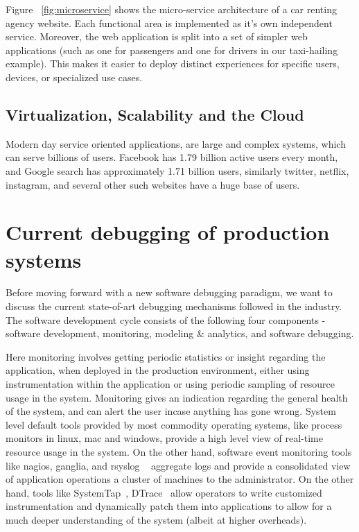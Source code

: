Figure ~\ref{fig:microservice} shows the micro-service architecture of a car renting agency website.
Each functional area is implemented as it's own independent service.
Moreover, the web application is split into a set of simpler web applications (such as one for passengers and one for drivers in our taxi-hailing example). This makes it easier to deploy distinct experiences for specific users, devices, or specialized use cases.


\subsection{Virtualization, Scalability and the Cloud}
\label{sec:backVirtualization}

Modern day service oriented applications, are large and complex systems, which can serve billions of users. Facebook has 1.79 billion active users every month, and Google search has approximately 1.71 billion users, similarly twitter, netflix, instagram, and several other such websites have a huge base of users. 


\section{Current debugging of production systems}
\label{sec:backCurrentStatus}

Before moving forward with a new software debugging paradigm, we want to discuss the current state-of-art debugging mechanisms followed in the industry. The software development cycle consists of the following four components - software development, monitoring, modeling \& analytics, and software debugging. 

Here monitoring involves getting periodic statistics or insight regarding the application, when deployed in the production environment, either using instrumentation within the application or using periodic sampling of resource usage in the system.
Monitoring gives an indication regarding the general health of the system, and can alert the user incase anything has gone wrong. 
System level default tools provided by most commodity operating systems, like process monitors in linux, mac and windows, provide a high level view of real-time resource usage in the system.
On the other hand, software event monitoring tools like nagios, ganglia, and rsyslog ~\cite{nagios,ganglia,rsyslog} aggregate logs and provide a consolidated view of application operations a cluster of machines to the administrator. 
On the other hand, tools like SystemTap~\cite{systemtap}, DTrace~\cite{dtrace} allow operators to write customized instrumentation and dynamically patch them into applications to allow for a much deeper understanding of the system (albeit at higher overheads).

